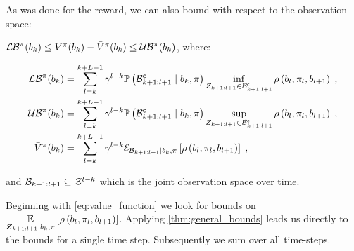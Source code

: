 As was done for the reward, we can also bound with respect to the observation space:
\begin{corollaryE}
	\label{thm:val_func_bounds_obs}
	$\lowerbound^\pi(\blf{k})\leq V^\pi(\blf{k})-\bar{V}^\pi(\blf{k})\leq\upperbound^\pi(\blf{k})$, where:
	\begin{small}
		\begin{subequations}
			\begin{align}
				\lowerbound\nolimits^\pi(\blf{k})& =\sum_{l=k}^{k+L-1}\gamma^{l-k}\measure{\stcompI{\subSpace}{k+1:l+1}\mid\blf{k},\pi}\inf_{\observations{k+1:l+1}\in\stcompI{\subSpace}{k+1:l+1}}\reward{\blf{l},\pi_l,\blf{l+1}}\;, \\
				\upperbound\nolimits^\pi(\blf{k})& =\sum_{l=k}^{k+L-1}\gamma^{l-k}\measure{\stcompI{\subSpace}{k+1:l+1}\mid\blf{k},\pi}\sup_{\observations{k+1:l+1}\in\stcompI{\subSpace}{k+1:l+1}}\reward{\blf{l},\pi_l,\blf{l+1}}\;, \\
				\bar{V}^\pi(\blf{k}) & =\sum_{l=k}^{k+L-1}\gamma^{l-k}\partialexpectation{\reward{\blf{l},\pi_l,\blf{l+1}}}{\subSpaceI{k+1:l+1}\mid\blf{k},\pi}\;,
			\end{align}
		\end{subequations}
	\end{small}
	and $\subSpaceI{k+1:l+1}\subseteq\observationSpace^{l-k}$ which is the joint observation space over time.
\end{corollaryE}
\begin{proofE}
	Beginning with \eqref{eq:value_function} we look for bounds on $\expectation{\reward{\blf{l},\pi_l,\blf{l+1}}}{\observationsRV{k+1:l+1}\mid\blf{k},\pi}$. Applying \cref{thm:general_bounds} leads us directly to the bounds for a single time step. Subsequently we sum over all time-steps.
\end{proofE}


